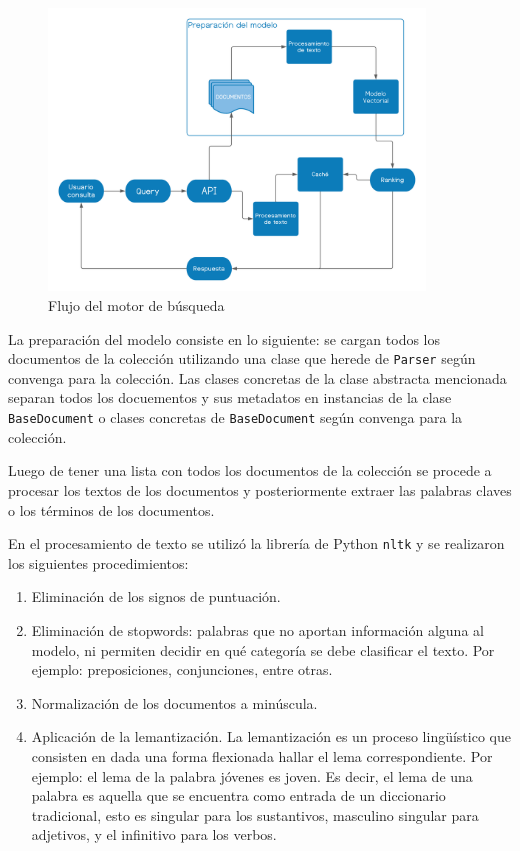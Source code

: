 \begin{figure}\label{esq}
    \includegraphics[width=10cm]{sections/img/esq.jpg}

    \caption{Flujo del motor de búsqueda}
\end{figure}

La preparación del modelo consiste en lo siguiente: se cargan todos los documentos de la colección utilizando una clase que herede de \verb|Parser| según convenga para la colección. Las clases concretas de la clase abstracta mencionada separan todos los docuementos y sus metadatos en instancias de la clase \verb|BaseDocument| o clases concretas de \verb|BaseDocument| según convenga para la colección.

Luego de tener una lista con todos los documentos de la colección se procede a procesar los textos de los documentos y posteriormente extraer las palabras claves o los términos de los documentos. 

En el procesamiento de texto se utilizó la librería de Python \verb|nltk| y se realizaron los siguientes procedimientos:

\begin{enumerate}
    \item Eliminación de los signos de puntuación.
    \item Eliminación de stopwords: palabras que no aportan información alguna al modelo, ni permiten decidir en qué categoría se debe clasificar el texto. Por ejemplo: preposiciones, conjunciones, entre otras.
    \item Normalización de los documentos a minúscula. 
    \item Aplicación de la lemantización.  La lemantización es un proceso lingüístico que consisten en dada una forma flexionada hallar el lema correspondiente. Por ejemplo: el lema de la palabra jóvenes es joven. Es decir, el lema de una palabra es aquella que se encuentra como entrada de un diccionario tradicional, esto es singular para los sustantivos, masculino singular para adjetivos, y el infinitivo para los verbos.
\end{enumerate}

